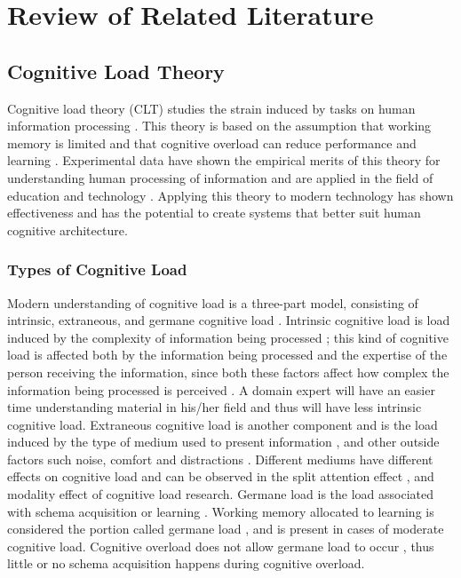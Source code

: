\chapter{Review of Related Literature}

\section{Cognitive Load Theory}
Cognitive load theory (CLT) studies the strain induced by tasks on human information processing \cite{hart2006, sweller2019architecture}. This theory is based on the assumption that working memory is limited \cite{sweller2010element} and that cognitive overload can reduce performance \cite{howie2023} and learning \cite{sweller2019architecture, klepsch2022}. Experimental data have shown the empirical merits of this theory for understanding human processing of information \cite{ahmad2023} and are applied in the field of education \cite{elglaly2024} and technology \cite{klepsch2022}. Applying this theory to modern technology has shown effectiveness \cite{klepsch2022} and has the potential to create systems that better suit human cognitive architecture.

\subsection{Types of Cognitive Load}
Modern understanding of cognitive load is a three-part model, consisting of intrinsic, extraneous, and  germane cognitive load \cite{sweller1988cognitive, sweller2019architecture, klepsch2022}. Intrinsic cognitive load is load induced by the complexity of information being processed \cite{sweller2019architecture}; this kind of cognitive load is affected both by the information being processed and the expertise of the person receiving the information, since both these factors affect how complex the information being processed is perceived \cite{sweller2019architecture}. A domain expert will have an easier time understanding material in his/her field and thus will have less intrinsic cognitive load. Extraneous cognitive load is another component and is the load induced by the type of medium used to present information \cite{sweller2019architecture}, and other outside factors such noise, comfort and distractions \cite{howie2023}. Different mediums have different effects on cognitive load and can be observed in the split attention effect \cite{sweller2019architecture, thees2020}, and modality effect \cite{sweller2019architecture} of cognitive load research. Germane load is the load associated with schema acquisition or learning \cite{sweller1988cognitive, sweller2019architecture}. Working memory allocated to learning is considered the portion called germane load \cite{sweller2010element}, and is present in cases of moderate cognitive load. Cognitive overload does not allow germane load to occur \cite{sweller2019architecture}, thus little or no schema acquisition happens during cognitive overload.

